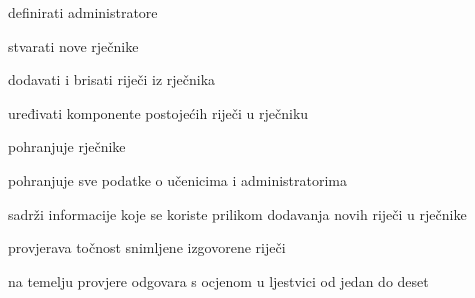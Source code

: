 \begin{packed_enum}
			
			\item  {}
			
			\begin{packed_enum}
				
				\item definirati administratore
				\item stvarati nove rječnike
				\item dodavati i brisati riječi iz rječnika
				\item uređivati komponente postojećih riječi u rječniku
				
			\end{packed_enum}
		
			
			\item  {}
		
			\begin{packed_enum}
			
			\item pohranjuje rječnike
			\item pohranjuje sve podatke o učenicima i administratorima
			
			\end{packed_enum}
		
			
			\item  {}
		
			\begin{packed_enum}
			
			\item sadrži informacije koje se koriste prilikom dodavanja novih riječi u rječnike
			
			\end{packed_enum}
		
			
			\item  {}
	
			\begin{packed_enum}
		
			\item provjerava točnost snimljene izgovorene riječi
			\item na temelju provjere odgovara s ocjenom u ljestvici od jedan do deset
		
			\end{packed_enum}		
		
	
			\end{packed_enum}
			
			\eject 
			
